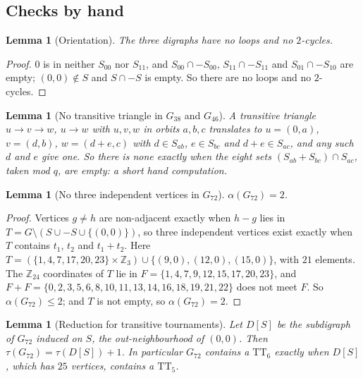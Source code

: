 \documentclass[11pt]{amsart}
\newcommand{\TT}[1]{\mathrm{TT}_{#1}}
\newcommand{\Z}{\mathbb{Z}}
\theoremstyle{plain}
\newtheorem{lemma}[theorem]{Lemma}
\theoremstyle{definition}
\theoremstyle{remark}
\begin{document}
\subsection*{Checks by hand}

\begin{lemma}[Orientation]\label{lem:orient}
The three digraphs have no loops and no $2$-cycles.
\end{lemma}

\begin{proof}
$0$ is in neither $S_{00}$ nor $S_{11}$, and $S_{00}\cap-S_{00}$, $S_{11}\cap-S_{11}$ and
$S_{01}\cap-S_{10}$ are empty; $(0,0)\notin S$ and $S\cap-S$ is empty. So there are no loops and no
$2$-cycles.
\end{proof}

\begin{lemma}[No transitive triangle in $G_{38}$ and $G_{46}$]\label{lem:tt3}
A transitive triangle $u\to v\to w$, $u\to w$ with $u,v,w$ in orbits $a,b,c$ translates to
$u=(0,a)$, $v=(d,b)$, $w=(d+e,c)$ with $d\in S_{ab}$, $e\in S_{bc}$ and $d+e\in S_{ac}$, and any such
$d$ and $e$ give one. So there is none exactly when the eight sets $(S_{ab}+S_{bc})\cap S_{ac}$,
taken mod $q$, are empty: a short hand computation.
\end{lemma}

\begin{lemma}[No three independent vertices in $G_{72}$]\label{lem:alpha}
$\alpha(G_{72})=2$.
\end{lemma}

\begin{proof}
Vertices $g\neq h$ are non-adjacent exactly when $h-g$ lies in
$T=G\setminus(S\cup-S\cup\{(0,0)\})$, so three independent vertices exist exactly when $T$ contains
$t_1$, $t_2$ and $t_1+t_2$. Here
$T=(\{1,4,7,17,20,23\}\times\Z_3)\cup\{(9,0),(12,0),(15,0)\}$, with $21$ elements. The $\Z_{24}$
coordinates of $T$ lie in $F=\{1,4,7,9,12,15,17,20,23\}$, and
$F+F=\{0,2,3,5,6,8,10,11,13,14,16,18,19,21,22\}$ does not meet $F$. So $\alpha(G_{72})\leq 2$; and
$T$ is not empty, so $\alpha(G_{72})=2$.
\end{proof}

\begin{lemma}[Reduction for transitive tournaments]\label{lem:reduce}
Let $D[S]$ be the subdigraph of $G_{72}$ induced on $S$, the out-neighbourhood of $(0,0)$. Then
$\tau(G_{72})=\tau(D[S])+1$. In particular $G_{72}$ contains a $\TT{6}$ exactly when $D[S]$, which
has $25$ vertices, contains a $\TT{5}$.
\end{lemma}
\end{document}
